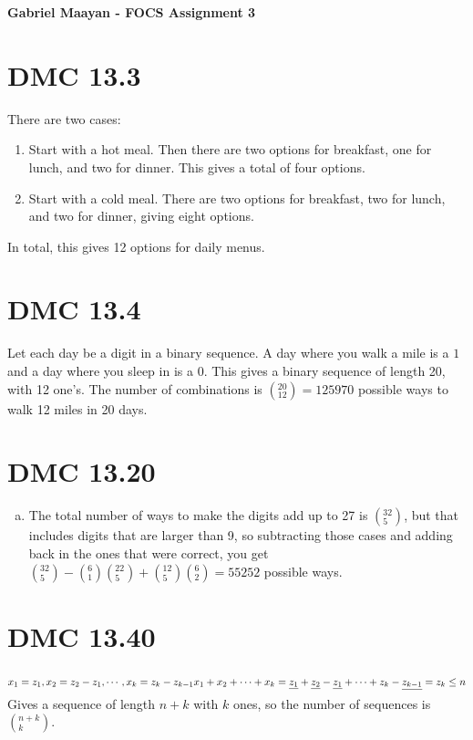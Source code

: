 \documentclass[]{article}
\def\math#1{$#1$}
\begin{document}
\bf \Large Gabriel Maayan - FOCS Assignment 3

\section{DMC 13.3}
There are two cases:
\begin{enumerate}[(1)]
\item Start with a hot meal. Then there are two options for breakfast, one for lunch, and two for dinner. This gives a total of four options.
\item Start with a cold meal. There are two options for breakfast, two for lunch, and two for dinner, giving eight options.
\end{enumerate}
In total, this gives 12 options for daily menus.

\section{DMC 13.4}
Let each day be a digit in a binary sequence. A day where you walk a mile is a \math{1} and a day where you sleep in is a \math{0}. 
This gives a binary sequence of length 20, with 12 one's. The number of combinations is \math{(_{12}^{20}) = 125970} possible ways 
to walk 12 miles in 20 days.

\section{DMC 13.20}
\begin{enumerate}[(c)]
\item The total number of ways to make the digits add up to 27 is \math{(_5^{32})}, but that includes digits that are larger than 9, so 
subtracting those cases and adding back in the ones that were correct, you get \math{(_5^{32})-(_1^6)(_5^{22})+(_5^{12})(_2^6)=55252} possible ways.


\end{enumerate}

\section{DMC 13.40}
\math{x_1=z_1, x_2=z_2-z_1, \cdots , x_k=z_k-z_{k-1}\\
x_1+x_2+\cdots +x_k=\sout{z_1}+\sout{z_2}-\sout{z_1}+\cdots+z_k-\sout{z_{k-1}}=z_k\leq n \\}
Gives a sequence of length \math{n+k} with \math{k} ones, so the number of sequences is \math{(_k^{n+k})}.
\end{document}
